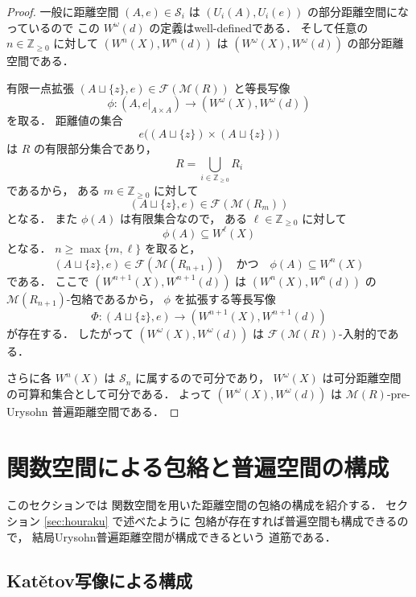 \documentclass[leqno, 12pt]{jsarticle}
\newcommand{\zz}{\mathbb{Z}}
\newcommand{\yozz}[1]{\zz_{\ge #1}}
\newcommand{\Met}[1]{\mathscr{M}(#1)}
\newcommand{\FinitePart}[1]{\mathscr{F}(#1)}
\newcommand{\FinMet}[1]{\FinitePart{\Met{#1}}}
\newcommand{\Wstage}[2]{W^{#1}(#2)}
\begin{document}
\begin{proof}
一般に距離空間
$(A, e)\in \mathscr{S}_{i}$
は
$(U_{i}(A), U_{i}(e))$
の部分距離空間になっているので
この
$\Wstage{\omega}{d}$
の定義はwell-definedである．
そして任意の
$n\in \yozz{0}$
に対して
$(\Wstage{n}{X}, \Wstage{n}{d})$
は
$(\Wstage{\omega}{X}, \Wstage{\omega}{d})$
の部分距離空間である．

有限一点拡張
$(A\sqcup\{z\}, e)\in\FinMet{R}$
と等長写像
\[
\phi\colon
(A, e|_{A\times A})
\longrightarrow
(\Wstage{\omega}{X}, \Wstage{\omega}{d})
\]
を取る．
距離値の集合
\[
e\bigl((A\sqcup\{z\})\times(A\sqcup\{z\})\bigr)
\]
は
$R$
の有限部分集合であり，
\[
R=\bigcup_{i\in\yozz{0}}R_i
\]
であるから，
ある
$m\in\yozz{0}$
に対して
\[
(A\sqcup\{z\}, e)\in\FinMet{R_m}
\]
となる．
また
$\phi(A)$
は有限集合なので，
ある
$\ell\in\yozz{0}$
に対して
\[
\phi(A)\subseteq\Wstage{\ell}{X}
\]
となる．
$n\ge\max\{m,\ell\}$
を取ると，
\[
(A\sqcup\{z\}, e)\in\FinMet{R_{n+1}}
\quad\text{かつ}\quad
\phi(A)\subseteq\Wstage{n}{X}
\]
である．
ここで
$(\Wstage{n+1}{X}, \Wstage{n+1}{d})$
は
$(\Wstage{n}{X}, \Wstage{n}{d})$
の
$\Met{R_{n+1}}$-包絡であるから，
$\phi$
を拡張する等長写像
\[
\Phi\colon
(A\sqcup\{z\}, e)
\longrightarrow
(\Wstage{n+1}{X}, \Wstage{n+1}{d})
\]
が存在する．
したがって
$(\Wstage{\omega}{X}, \Wstage{\omega}{d})$
は
$\FinMet{R}$-入射的である．

さらに各
$\Wstage{n}{X}$
は
$\mathscr S_n$
に属するので可分であり，
$\Wstage{\omega}{X}$
は可分距離空間の可算和集合として可分である．
よって
$(\Wstage{\omega}{X}, \Wstage{\omega}{d})$
は
$\Met{R}$-pre-Urysohn
普遍距離空間である．
\end{proof}











\newpage
\section{関数空間による包絡と普遍空間の構成}\label{sec:hourakuhouraku}
このセクションでは
関数空間を用いた距離空間の包絡の構成を紹介する．
セクション
\ref{sec:houraku}
で述べたように
包絡が存在すれば普遍空間も構成できるので，
結局Urysohn普遍距離空間が構成できるという
道筋である．


\subsection{\texorpdfstring{Kat\v{e}tov}{Katetov}写像による構成}\label{subsec:function-envelope:katetov}
\end{document}
